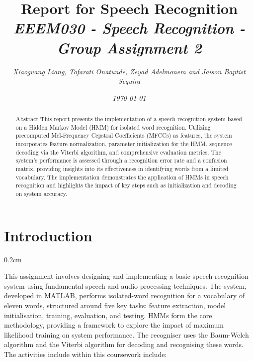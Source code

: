\documentclass{article}
\newcommand{\setParDis}{\setlength {\parskip} {0.2cm} } %
\begin{document}
\title{%
Report for Speech Recognition \\
\large\itshape{EEEM030 - Speech Recognition - Group Assignment 2}}
\author{\normalsize\slshape{Xiaoguang Liang, Tofarati Onatunde, Zeyad Adelmonem and Jaison Baptist Sequira}}
\date{\normalsize\slshape\today}
\maketitle


\suppressfloats

\tableofcontents

\begin{abstract}
Abstract
This report presents the implementation of a speech recognition system based on a Hidden Markov Model (HMM) for isolated word recognition. Utilizing precomputed Mel-Frequency Cepstral Coefficients (MFCCs) as features, the system incorporates feature normalization, parameter initialization for the HMM, sequence decoding via the Viterbi algorithm, and comprehensive evaluation metrics. The system’s performance is assessed through a recognition error rate and a confusion matrix, providing insights into its effectiveness in identifying words from a limited vocabulary. The implementation demonstrates the application of HMMs in speech recognition and highlights the impact of key steps such as initialization and decoding on system accuracy.

\end{abstract}


\section{Introduction}
\setParDis

This assignment involves designing and implementing a basic speech recognition system using fundamental speech and audio processing techniques. The system, developed in MATLAB, performs isolated-word recognition for a vocabulary of eleven words, structured around five key tasks: feature extraction, model initialisation, training, evaluation, and testing. HMMs form the core methodology, providing a framework to explore the impact of maximum likelihood training on system performance. The recogniser uses the Baum-Welch algorithm and the Viterbi algorithm for decoding and recognising these words. The activities include within this coursework include:
\end{document}
